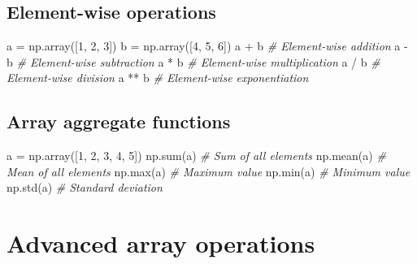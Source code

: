 \documentclass[11pt]{article}
\newenvironment{Shaded}{}{}
\newcommand{\DecValTok}[1]{\textcolor[rgb]{0.25,0.63,0.44}{{#1}}}
\newcommand{\CommentTok}[1]{\textcolor[rgb]{0.38,0.63,0.69}{\textit{{#1}}}}
\newcommand{\NormalTok}[1]{{#1}}
\newcommand{\OperatorTok}[1]{\textcolor[rgb]{0.40,0.40,0.40}{{#1}}}
\newcommand{\BuiltInTok}[1]{{#1}}
\begin{document}
\subsection{\texorpdfstring{{Element-wise
operations}}{Element-wise operations}}\label{element-wise-operations}

\begin{Shaded}
\begin{Highlighting}[]
\NormalTok{    a }\OperatorTok{=}\NormalTok{ np.array([}\DecValTok{1}\NormalTok{, }\DecValTok{2}\NormalTok{, }\DecValTok{3}\NormalTok{])}
\NormalTok{    b }\OperatorTok{=}\NormalTok{ np.array([}\DecValTok{4}\NormalTok{, }\DecValTok{5}\NormalTok{, }\DecValTok{6}\NormalTok{])}
\NormalTok{    a }\OperatorTok{+}\NormalTok{ b        }\CommentTok{\# Element{-}wise addition}
\NormalTok{    a }\OperatorTok{{-}}\NormalTok{ b        }\CommentTok{\# Element{-}wise subtraction}
\NormalTok{    a }\OperatorTok{*}\NormalTok{ b        }\CommentTok{\# Element{-}wise multiplication}
\NormalTok{    a }\OperatorTok{/}\NormalTok{ b        }\CommentTok{\# Element{-}wise division}
\NormalTok{    a }\OperatorTok{**}\NormalTok{ b       }\CommentTok{\# Element{-}wise exponentiation}
\end{Highlighting}
\end{Shaded}

\subsection{\texorpdfstring{{Array aggregate
functions}}{Array aggregate functions}}\label{array-aggregate-functions}

\begin{Shaded}
\begin{Highlighting}[]
\NormalTok{    a }\OperatorTok{=}\NormalTok{ np.array([}\DecValTok{1}\NormalTok{, }\DecValTok{2}\NormalTok{, }\DecValTok{3}\NormalTok{, }\DecValTok{4}\NormalTok{, }\DecValTok{5}\NormalTok{])}
\NormalTok{    np.}\BuiltInTok{sum}\NormalTok{(a)    }\CommentTok{\# Sum of all elements}
\NormalTok{    np.mean(a)   }\CommentTok{\# Mean of all elements}
\NormalTok{    np.}\BuiltInTok{max}\NormalTok{(a)    }\CommentTok{\# Maximum value}
\NormalTok{    np.}\BuiltInTok{min}\NormalTok{(a)    }\CommentTok{\# Minimum value}
\NormalTok{    np.std(a)    }\CommentTok{\# Standard deviation}
\end{Highlighting}
\end{Shaded}

\section{\texorpdfstring{{Advanced array
operations}}{Advanced array operations}}\label{advanced-array-operations}
\end{document}
